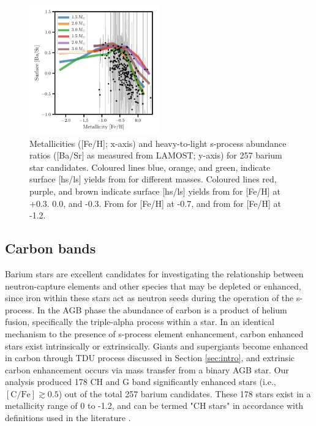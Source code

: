 \documentclass[a4paper,fleqn,usenatbib]{mnras}
\begin{document}
\begin{figure}
	\includegraphics[width=0.5\textwidth]{yields_test.pdf}
    \caption{Metallicities ([Fe/H]; x-axis) and heavy-to-light s-process abundance ratios ([Ba/Sr] as measured from LAMOST; y-axis) for 257 barium star candidates. Coloured lines blue, orange, and green, indicate surface [hs/ls] yields from \citet{cristallo2015} for different masses. Coloured lines red, purple, and brown indicate surface [hs/ls] yields from \citet{karakas_lugaro2016} for [Fe/H] at +0.3. 0.0, and -0.3. From \citet{karakas2018} for [Fe/H] at -0.7, and from \citet{fishlock2014} for [Fe/H] at -1.2.}
    \label{fig:figure3}
\end{figure}

\subsection{Carbon bands}
Barium stars are excellent candidates for investigating the relationship between neutron-capture elements and other species that may be depleted or enhanced, since iron within these stars act as neutron seeds during the operation of the s-process. In the AGB phase the abundance of carbon is a product of helium fusion, specifically the triple-alpha process within a star. In an identical mechanism to the presence of s-process element enhancement, carbon enhanced stars exist intrinsically or extrinsically. Giants and supergiants become enhanced in carbon through TDU process discussed in Section \ref{sec:intro}, and extrinsic carbon enhancement occurs via mass transfer from a binary AGB star. Our analysis produced 178 CH and G band significantly enhanced stars (i.e., $[\textrm{C/Fe}] \gtrsim 0.5$) out of the total 257 barium candidates. These 178 stars exist in a metallicity range of 0 to -1.2, and can be termed "CH stars" in accordance with definitions used in the literature \citep[e.g.][]{luck1991, mcclure1997}.
\end{document}
